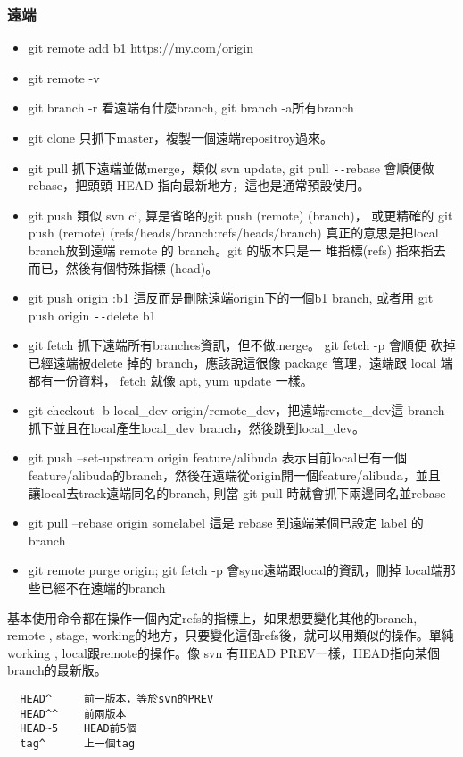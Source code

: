   \subsubsection{遠端}
  \begin{itemize}
    \item git remote add b1 https://my.com/origin
    \item git remote -v
    \item git branch -r 看遠端有什麼branch, git branch -a所有branch
    \item git clone 只抓下master，複製一個遠端repositroy過來。
    \item git pull 抓下遠端並做merge，類似 svn update, git pull \verb=--=rebase
      會順便做 rebase，把頭頭 HEAD 指向最新地方，這也是通常預設使用。
    \item git push 類似 svn ci, 算是省略的git push (remote) (branch)，
      或更精確的 git push (remote) (refs/heads/branch:refs/heads/branch)
      真正的意思是把local branch放到遠端 remote 的 branch。git 的版本只是一
      堆指標(refs) 指來指去而已，然後有個特殊指標 (head)。
    \item git push origin :b1 這反而是刪除遠端origin下的一個b1 branch, 或者用
      git push origin \verb=--=delete b1
    \item git fetch 抓下遠端所有branches資訊，但不做merge。 git fetch -p 會順便
      砍掉已經遠端被delete 掉的 branch，應該說這很像 package 管理，遠端跟 local
      端都有一份資料， fetch 就像 apt, yum update 一樣。
    \item git checkout -b local\_dev origin/remote\_dev，把遠端remote\_dev這
      branch抓下並且在local產生local\_dev branch，然後跳到local\_dev。
    \item git push --set-upstream origin feature/alibuda 表示目前local已有一個
      feature/alibuda的branch，然後在遠端從origin開一個feature/alibuda，並且
      讓local去track遠端同名的branch, 則當 git pull 時就會抓下兩邊同名並rebase
    \item git pull --rebase origin somelabel 這是 rebase 到遠端某個已設定 label
      的 branch
    \item git remote purge origin; git fetch -p 會sync遠端跟local的資訊，刪掉
      local端那些已經不在遠端的branch
  \end{itemize}
  基本使用命令都在操作一個內定refs的指標上，如果想要變化其他的branch, remote
  , stage, working的地方，只要變化這個refs後，就可以用類似的操作。單純working
  , local跟remote的操作。像 svn 有HEAD PREV一樣，HEAD指向某個branch的最新版。
  \begin{verbatim}
  HEAD^     前一版本，等於svn的PREV
  HEAD^^    前兩版本
  HEAD~5    HEAD前5個
  tag^      上一個tag
  \end{verbatim}
